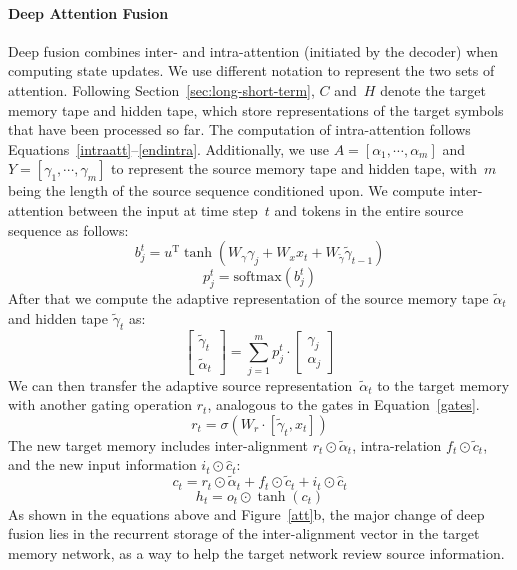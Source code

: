 \documentclass[11pt,letterpaper]{article}
\begin{document}
	\paragraph{Deep Attention Fusion} Deep fusion combines inter-
        and intra-attention (initiated by the decoder) when computing
        state updates.  We use different notation to represent the two
        sets of attention.  Following
        Section~\ref{sec:long-short-term}, $C$ and~$H$ denote the
        target memory tape and hidden tape, which store
        representations of the target symbols that have been processed
        so far.  The computation of intra-attention follows
        Equations~\eqref{intraatt}--\eqref{endintra}.  Additionally, we
        use $A=[\alpha_1, \cdots, \alpha_m]$ and $Y=[\gamma_1, \cdots,
        \gamma_m]$ to represent the source memory tape and hidden
        tape, with~$m$ being the length of the source sequence
        conditioned upon. We compute inter-attention between the input
        at time step~$t$ and tokens in the entire source sequence as
        follows:
	\begin{equation}
		b_j^t = u^\text{T} \tanh(W_{\gamma} {\gamma}_j + W_x x_t + W_{\tilde{\gamma}} \tilde{\gamma}_{t-1})
	\end{equation}
	\begin{equation}
		p_j^t = \text{softmax} (b_j^t)
	\end{equation}
	After that we compute the adaptive representation of the source memory
        tape $\tilde{\alpha}_t$ and hidden tape $\tilde{\gamma}_t$ as:
	\begin{equation}
		\begin{bmatrix}
			\tilde{\gamma}_t \\ \tilde{\alpha}_t
		\end{bmatrix} = \sum\limits_{j=1}^{m} p_j^t \cdot
		\begin{bmatrix}
			\gamma_j \\ \alpha_j
		\end{bmatrix} 
	\end{equation}
	We can then transfer the adaptive source
        representation~$\tilde{\alpha}_t$ to the target memory with
        another gating operation $r_t$, analogous to the gates in
        Equation~\eqref{gates}.
		\begin{equation}
			r_t = \sigma (W_r \cdot [\tilde{\gamma}_t, x_t])
		\end{equation}
                The new target memory includes inter-alignment $r_t
                \odot \tilde{\alpha}_t$, intra-relation $f_t \odot
                \tilde{c}_{t}$, and the new input information $i_t
                \odot \hat{c}_t $:
	\begin{equation} c_t =  r_t \odot \tilde{\alpha}_t + f_t \odot \tilde{c}_{t} +
		i_t \odot \hat{c}_t 
	\end{equation}
	\begin{equation} h_t = o_t \odot \tanh(c_t)
	\end{equation} 
As shown in the equations above and Figure~\ref{att}b, the
        major change of deep fusion lies in the recurrent storage of
        the inter-alignment vector in the target memory network, as a
        way to help the target network review source information.
	
\end{document}
